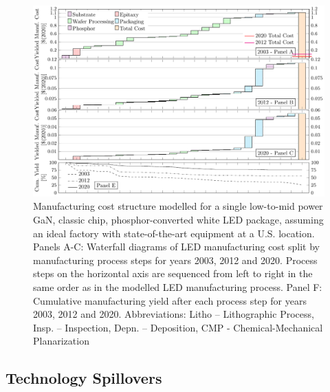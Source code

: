 \documentclass[twoside,twocolumn,9pt]{article}
\begin{document}
\begin{figure}[h!]
 \centering
 \includegraphics[width=17.5cm]{2_SSL_EES/article/figures/costmodel_results_years.pdf}
 \caption{Manufacturing cost structure modelled for a single low-to-mid power GaN, classic chip, phosphor-converted white LED package, assuming an ideal factory with state-of-the-art equipment at a U.S. location. Panels A-C: Waterfall diagrams of LED manufacturing cost split by manufacturing process steps for years 2003, 2012 and 2020. Process steps on the horizontal axis are sequenced from left to right in the same order as in the modelled LED manufacturing process. Panel F: Cumulative manufacturing yield after each process step for years 2003, 2012 and 2020. Abbreviations: Litho – Lithographic Process, Insp. – Inspection, Depn. – Deposition, CMP - Chemical-Mechanical Planarization}
 \label{fgr:costmodel}
\end{figure}

\subsection{Technology Spillovers}
\label{subsec:spillovers}
\end{document}
